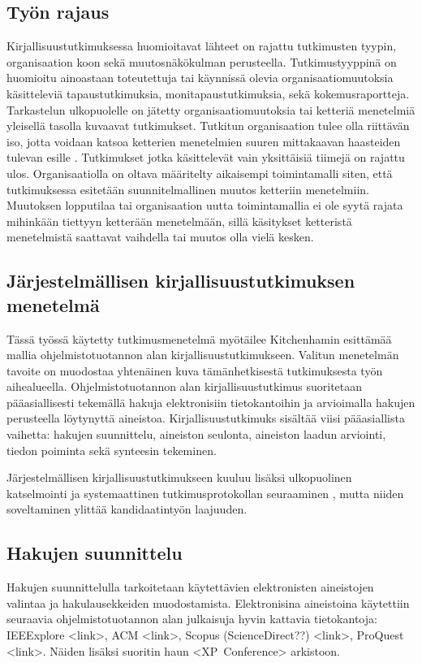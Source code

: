 \subsection{Työn rajaus}
Kirjallisuustutkimuksessa huomioitavat lähteet on rajattu tutkimusten tyypin,
organisaation koon sekä muutosnäkökulman perusteella. Tutkimustyyppinä on
huomioitu ainoastaan toteutettuja tai käynnissä olevia organisaatiomuutoksia
käsitteleviä tapaustutkimuksia, monitapaustutkimuksia, sekä kokemusraportteja.
Tarkastelun ulkopuolelle on jätetty organisaatiomuutoksia tai ketteriä
menetelmiä yleisellä tasolla kuvaavat tutkimukset. Tutkitun organisaation tulee
olla riittävän iso, jotta voidaan katsoa ketterien menetelmien suuren
mittakaavan haasteiden tulevan esille . Tutkimukset jotka
käsittelevät vain yksittäisiä tiimejä on rajattu ulos. Organisaatiolla on oltava
määritelty aikaisempi toimintamalli siten, että tutkimuksessa esitetään
suunnitelmallinen muutos ketteriin menetelmiin. Muutoksen lopputilaa tai
organisaation uutta toimintamallia ei ole syytä rajata mihinkään tiettyyn
ketterään menetelmään, sillä käsitykset ketteristä menetelmistä saattavat
vaihdella tai muutos olla vielä kesken.

\subsection{Järjestelmällisen kirjallisuustutkimuksen menetelmä}

Tässä työssä käytetty tutkimusmenetelmä myötäilee Kitchenhamin esittämää mallia
ohjelmistotuotannon alan kirjallisuustutkimukseen. Valitun menetelmän tavoite on
muodostaa yhtenäinen kuva tämänhetkisestä tutkimuksesta työn aihealueella.
Ohjelmistotuotannon alan kirjallisuustutkimus suoritetaan pääasiallisesti
tekemällä hakuja elektronisiin tietokantoihin ja arvioimalla hakujen perusteella
löytynyttä aineistoa. Kirjallisuustutkimuks sisältää viisi pääasiallista
vaihetta: hakujen suunnittelu, aineiston seulonta, aineiston laadun arviointi,
tiedon poiminta sekä synteesin tekeminen. 

Järjestelmällisen kirjallisuustutkimukseen kuuluu lisäksi ulkopuolinen
katselmointi ja systemaattinen tutkimusprotokollan seuraaminen
, mutta niiden soveltaminen ylittää kandidaatintyön
laajuuden.

\subsection{Hakujen suunnittelu}
Hakujen suunnittelulla tarkoitetaan käytettävien elektronisten aineistojen
valintaa ja hakulausekkeiden muodostamista. Elektronisina aineistoina käytettiin
seuraavia ohjelmistotuotannon alan julkaisuja hyvin kattavia tietokantoja:
IEEExplore <link>, ACM <link>, Scopus (ScienceDirect??) <link>, ProQuest <link>.
Näiden lisäksi suoritin haun <XP~Conference> arkistoon.

